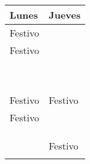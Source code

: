 \documentclass[a4paper,12pt]{article}
\begin{document}
\newcommand{\juevesA}{25 de enero}
\newcommand{\juevesB}{1 de febrero}
\newcommand{\juevesC}{8 de febrero}
\newcommand{\juevesD}{15 de febrero}
\newcommand{\juevesE}{22 de febrero}
\newcommand{\juevesF}{29 de febrero}
\newcommand{\juevesG}{7 de marzo}
\newcommand{\juevesH}{14 de marzo}
\newcommand{\juevesI}{21 de marzo}
\newcommand{\juevesJ}{4 de abril}
\newcommand{\juevesK}{11 de abril}
\newcommand{\juevesL}{18 de abril}
\newcommand{\juevesM}{25 de abril}
\newcommand{\juevesN}{9 de mayo}

\begin{tabular}{|l|l|}
   \hline
  Lunes & Jueves \\ \hline \hline
  Festivo              & \nameref{cal:juevesA} \\ \hline
  Festivo              & \nameref{cal:juevesB} \\
                       & \nameref{cal:juevesBb} \\ \hline
  \nameref{cal:lunesA} & \nameref{cal:juevesC} \\ 
                       & \nameref{cal:juevesCb} \\  \hline  
  \nameref{cal:lunesB} & \nameref{cal:juevesD} \\ \hline
  \nameref{cal:lunesC} & \nameref{cal:juevesE} \\ \hline
  \nameref{cal:lunesD} & \nameref{cal:juevesF} \\ \hline
  \nameref{cal:lunesE} & \nameref{cal:juevesG} \\ \hline
  \nameref{cal:lunesF} & \nameref{cal:juevesH} \\ \hline
  \nameref{cal:lunesG} & \nameref{cal:juevesI} \\ \hline
  Festivo              & Festivo               \\ \hline
  Festivo              & \nameref{cal:juevesJ} \\ \hline
  \nameref{cal:lunesH} & \nameref{cal:juevesK} \\ \hline
  \nameref{cal:lunesI} & \nameref{cal:juevesL} \\ \hline
  \nameref{cal:lunesJ} & \nameref{cal:juevesM} \\ \hline
  \nameref{cal:lunesK} & Festivo               \\ \hline
  \nameref{cal:lunesL} & \nameref{cal:juevesN} \\ \hline
\end{tabular}

\newpage

\end{document}
